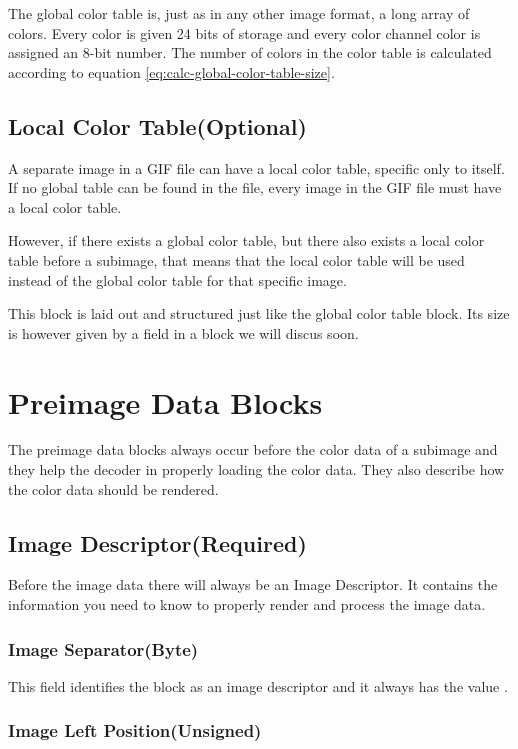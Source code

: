 The global color table is, just as in any other image format, a long
array of colors. Every color is given 24 bits of storage and every
color channel color is assigned an 8-bit number. The number of colors
in the color table is calculated according to equation \ref{eq:calc-global-color-table-size}.

\subsection{Local Color Table(Optional)}

A separate image in a GIF file can have a local color table, specific
only to itself. If no global table can be found in the file, every
image in the GIF file must have a local color table.

However, if there exists a global color table, but there also exists a
local color table before a subimage, that means that the local color
table will be used instead of the global color table for that specific
image.

This block is laid out and structured just like the global color table
block. Its size is however given by a field in a block we will discus
soon.

\section{Preimage Data Blocks}

The preimage data blocks always occur before the color data of a
subimage and they help the decoder in properly loading the color
data. They also describe how the color data should be rendered.

\subsection{Image Descriptor(Required)}

Before the image data there will always be an Image Descriptor. It
contains the information you need to know to properly render and
process the image data.

\subsubsection{Image Separator(Byte)}

This field identifies the block as an image descriptor and it always
has the value .

\subsubsection{Image Left Position(Unsigned)}
